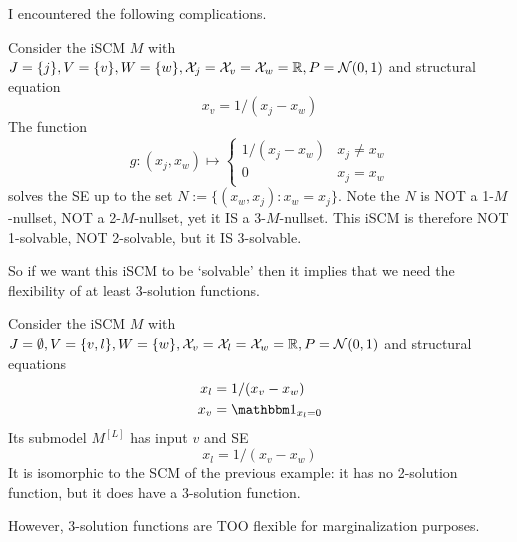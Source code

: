 I encountered the following complications.
\begin{Eg}\label{eg:scm_nullset_problems_marginalization_1}
  Consider the iSCM $M$ with $J=\{j\},V=\{v\},W=\{w\},\mathcal{X}_j=\mathcal{X}_v=\mathcal{X}_w=\mathbb{R},P=\mathcal{N}(0,1)$ and structural equation
  $$x_v = 1 / (x_j - x_w)$$
  The function
  $$g : (x_j,x_w) \mapsto \begin{cases}
    1 / (x_j - x_w) & x_j \ne x_w \\
    0 & x_j = x_w 
    \end{cases}$$
  solves the SE up to the set $N := \{(x_w,x_j) : x_w = x_j\}$.
  Note the $N$ is NOT a 1-$M$-nullset, NOT a 2-$M$-nullset, yet it IS a 3-$M$-nullset.
  This iSCM is therefore NOT 1-solvable, NOT 2-solvable, but it IS 3-solvable.
\end{Eg}
So if we want this iSCM to be `solvable' then it implies that we need the flexibility of at least 3-solution functions.
\begin{Eg}\label{eg:scm_nullset_problems_marginalization_2}
  Consider the iSCM $M$ with $J=\emptyset,V=\{v,l\},W=\{w\},\mathcal{X}_v=\mathcal{X}_l=\mathcal{X}_w=\mathbb{R},P=\mathcal{N}(0,1)$ and structural equations
  \begin{align*}
    x_l &= 1 / (x_v - x_w) \\
    x_v &= \ind_{x_l=0}
  \end{align*}
  Its submodel $M^{[L]}$ has input $v$ and SE
  $$x_l = 1 / (x_v - x_w)$$
  It is isomorphic to the SCM of the previous example: it has no 2-solution function, but it does have a 3-solution function.
\end{Eg}
However, 3-solution functions are TOO flexible for marginalization purposes.
